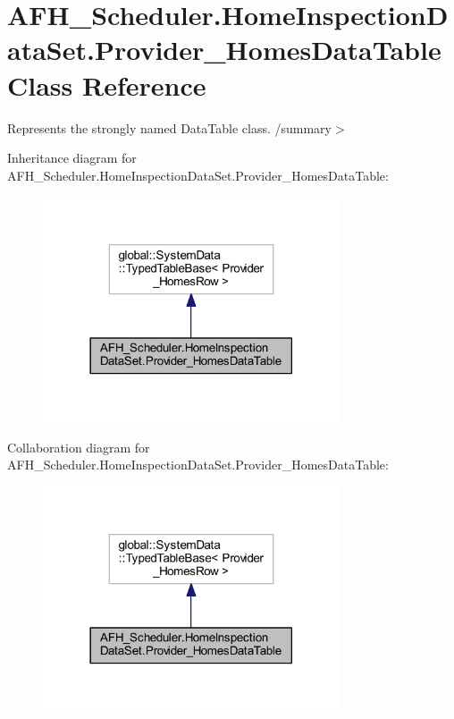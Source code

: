 \section{A\+F\+H\+\_\+\+Scheduler.\+Home\+Inspection\+Data\+Set.\+Provider\+\_\+\+Homes\+Data\+Table Class Reference}
\label{class_a_f_h___scheduler_1_1_home_inspection_data_set_1_1_provider___homes_data_table}


Represents the strongly named Data\+Table class. /summary$>$  




Inheritance diagram for A\+F\+H\+\_\+\+Scheduler.\+Home\+Inspection\+Data\+Set.\+Provider\+\_\+\+Homes\+Data\+Table\+:
\nopagebreak
\begin{figure}[H]
\begin{center}
\leavevmode
\includegraphics[width=249pt]{class_a_f_h___scheduler_1_1_home_inspection_data_set_1_1_provider___homes_data_table__inherit__graph}
\end{center}
\end{figure}


Collaboration diagram for A\+F\+H\+\_\+\+Scheduler.\+Home\+Inspection\+Data\+Set.\+Provider\+\_\+\+Homes\+Data\+Table\+:
\nopagebreak
\begin{figure}[H]
\begin{center}
\leavevmode
\includegraphics[width=249pt]{class_a_f_h___scheduler_1_1_home_inspection_data_set_1_1_provider___homes_data_table__coll__graph}
\end{center}
\end{figure}
